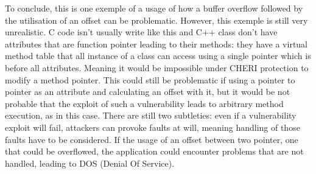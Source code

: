 \documentclass[a4paper, 11pt]{article}
\begin{document}
\begin{center}
\end{center}

To conclude, this is one exemple of a usage of how a buffer overflow followed by the utilisation of an offset can be problematic.
However, this exemple is still very unrealistic. C code isn't usually write like this and C++ class don't have attributes that are function pointer leading to their methods: they have a virtual method table that all instance of a class can access using a single pointer which is before all attributes. Meaning it would be impossible under CHERI protection to modify a method pointer. This could still be problematic if using a pointer to pointer as an attribute and calculating an offset with it, but it would be not probable that the exploit of such a vulnerability leads to arbitrary method execution, as in this case.
There are still two subtleties: even if a vulnerability exploit will fail, attackers can provoke faults at will, meaning handling of those faults have to be considered. If the usage of an offset between two pointer, one that could be overflowed, the application could encounter problems that are not handled, leading to DOS (Denial Of Service).
\clearpage 


\end{document}
